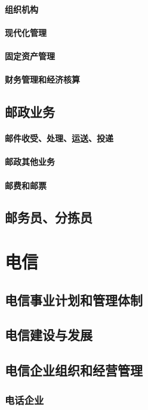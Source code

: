 \documentclass[UTF8]{../../RepresentationUniverse}
\begin{document}
        \subsubsection{组织机构}
        \subsubsection{现代化管理}
        \subsubsection{固定资产管理}
        \subsubsection{财务管理和经济核算}
    \section{邮政业务}
        \subsubsection{邮件收受、处理、运送、投递}
        \subsubsection{邮政其他业务}
        \subsubsection{邮费和邮票}
    \section{邮务员、分拣员}



\chapter{电信}
\section{电信事业计划和管理体制}
\section{电信建设与发展}
\section{电信企业组织和经营管理}
    \subsection{电话企业}
\end{document}
